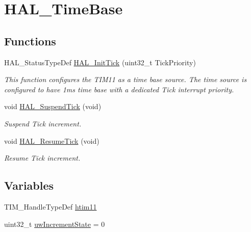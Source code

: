 \hypertarget{group___h_a_l___time_base}{}\section{H\+A\+L\+\_\+\+Time\+Base}
\label{group___h_a_l___time_base}
\subsection*{Functions}
\begin{DoxyCompactItemize}
\item 
H\+A\+L\+\_\+\+Status\+Type\+Def \hyperlink{group___h_a_l___time_base_ga879cdb21ef051eb81ec51c18147397d5}{H\+A\+L\+\_\+\+Init\+Tick} (uint32\+\_\+t Tick\+Priority)
\begin{DoxyCompactList}\small\item\em This function configures the T\+I\+M11 as a time base source. The time source is configured to have 1ms time base with a dedicated Tick interrupt priority. \end{DoxyCompactList}\item 
void \hyperlink{group___h_a_l___time_base_gaaf651af2afe688a991c657f64f8fa5f9}{H\+A\+L\+\_\+\+Suspend\+Tick} (void)
\begin{DoxyCompactList}\small\item\em Suspend Tick increment. \end{DoxyCompactList}\item 
void \hyperlink{group___h_a_l___time_base_ga24e0ee9dae1ec0f9d19200f5575ff790}{H\+A\+L\+\_\+\+Resume\+Tick} (void)
\begin{DoxyCompactList}\small\item\em Resume Tick increment. \end{DoxyCompactList}\end{DoxyCompactItemize}
\subsection*{Variables}
\begin{DoxyCompactItemize}
\item 
T\+I\+M\+\_\+\+Handle\+Type\+Def \hyperlink{group___h_a_l___time_base_ga2f22f985c4f33318fdcd4cc996623bf4}{htim11}
\item 
uint32\+\_\+t \hyperlink{group___h_a_l___time_base_gad252e5fa14fe03797c816cfb14962693}{uw\+Increment\+State} = 0
\end{DoxyCompactItemize}


